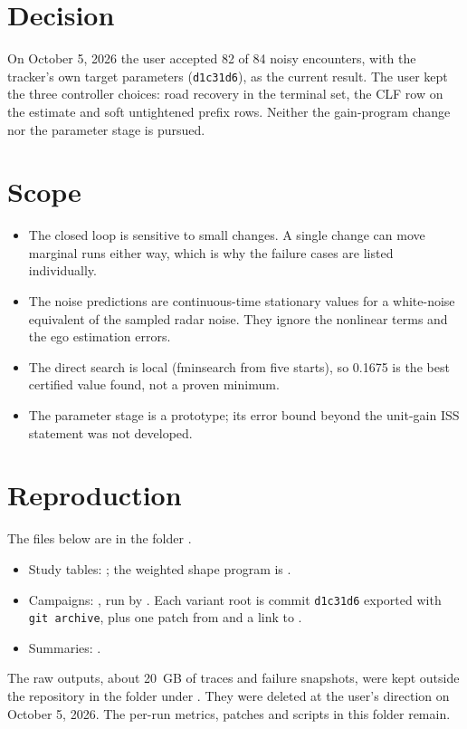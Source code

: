 \documentclass[11pt]{article}
\begin{document}
\section{Decision}
On October 5, 2026 the user accepted 82 of 84 noisy encounters, with the
tracker's own target parameters (\texttt{d1c31d6}), as the current result.
The user kept the three controller choices: road recovery in the terminal
set, the CLF row on the estimate and soft untightened prefix rows. Neither
the gain-program change nor the parameter stage is pursued.

\section{Scope}
\begin{itemize}
\item The closed loop is sensitive to small changes. A single change can move
  marginal runs either way, which is why the failure cases are listed
  individually.
\item The noise predictions are continuous-time stationary values for a
  white-noise equivalent of the sampled radar noise. They ignore the
  nonlinear terms and the ego estimation errors.
\item The direct search is local (fminsearch from five starts), so 0.1675 is
  the best certified value found, not a proven minimum.
\item The parameter stage is a prototype; its error bound beyond the
  unit-gain ISS statement was not developed.
\end{itemize}

\section{Reproduction}
The files below are in the folder
.
\begin{itemize}
\item Study tables: ; the weighted shape
  program is .
\item Campaigns: , run by
  . Each variant root is commit
  \texttt{d1c31d6} exported with \texttt{git archive}, plus one patch from
   and a link to .
\item Summaries: .
\end{itemize}
The raw outputs, about 20~GB of traces and failure snapshots, were kept
outside the repository in the folder  under
. They were deleted at the user's
direction on October 5, 2026. The per-run metrics, patches and scripts in
this folder remain.
\end{document}

